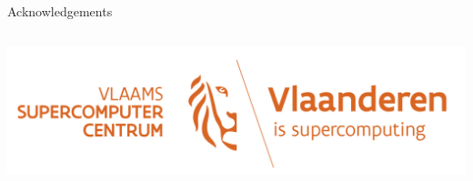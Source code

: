 \documentclass[9pt,t,xcolor=table]{beamer}
\begin{document}
\begin{frame}{\huge Acknowledgements}
\begin{columns}
\begin{column}[c]{0.3\textwidth}
			\includegraphics[width=\textwidth]{Figs/VSC-Combilogo.png}\\\vfill
		\end{column}
	\end{columns}

	\vspace{3pt}
\end{frame}
\end{document}
